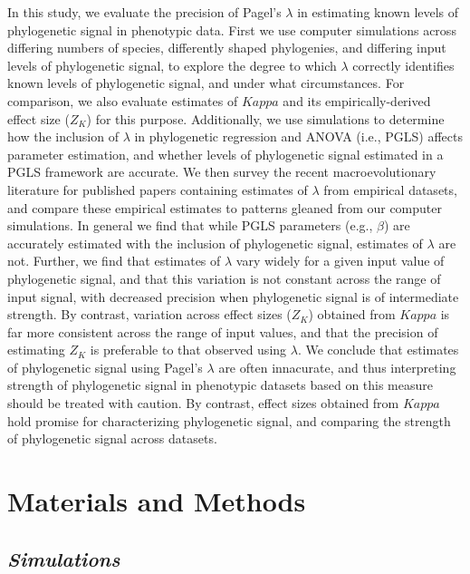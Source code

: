 \documentclass[
]{article}
\begin{document}
In this study, we evaluate the precision of Pagel's \(\lambda\) in
estimating known levels of phylogenetic signal in phenotypic data. First
we use computer simulations across differing numbers of species,
differently shaped phylogenies, and differing input levels of
phylogenetic signal, to explore the degree to which \(\lambda\)
correctly identifies known levels of phylogenetic signal, and under what
circumstances. For comparison, we also evaluate estimates of \(Kappa\)
and its empirically-derived effect size (\(Z_K\)) for this purpose.
Additionally, we use simulations to determine how the inclusion of
\(\lambda\) in phylogenetic regression and ANOVA (i.e., PGLS) affects
parameter estimation, and whether levels of phylogenetic signal
estimated in a PGLS framework are accurate. We then survey the recent
macroevolutionary literature for published papers containing estimates
of \(\lambda\) from empirical datasets, and compare these empirical
estimates to patterns gleaned from our computer simulations. In general
we find that while PGLS parameters (e.g., \(\beta\)) are accurately
estimated with the inclusion of phylogenetic signal, estimates of
\(\lambda\) are not. Further, we find that estimates of \(\lambda\) vary
widely for a given input value of phylogenetic signal, and that this
variation is not constant across the range of input signal, with
decreased precision when phylogenetic signal is of intermediate
strength. By contrast, variation across effect sizes (\(Z_K\)) obtained
from \(Kappa\) is far more consistent across the range of input values,
and that the precision of estimating \(Z_K\) is preferable to that
observed using \(\lambda\). We conclude that estimates of phylogenetic
signal using Pagel's \(\lambda\) are often innacurate, and thus
interpreting strength of phylogenetic signal in phenotypic datasets
based on this measure should be treated with caution. By contrast,
effect sizes obtained from \(Kappa\) hold promise for characterizing
phylogenetic signal, and comparing the strength of phylogenetic signal
across datasets.

\hypertarget{materials-and-methods}{%
\section{Materials and Methods}\label{materials-and-methods}}

\hypertarget{simulations}{%
\subsection{\texorpdfstring{\emph{Simulations}}{Simulations}}\label{simulations}}
\end{document}
